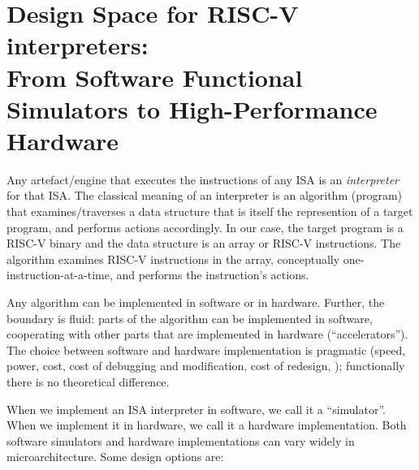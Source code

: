 

\chapter{Design Space for RISC-V interpreters: \\
{From Software Functional Simulators to High-Performance Hardware}}

\setcounter{page}{1}
\renewcommand{\thepage}{\arabic{chapter}-\arabic{page}}

\label{ch_RISCV_Design_Space}


Any artefact/engine that executes the instructions of any ISA is an
\emph{interpreter} for that ISA. The classical meaning of an
interpreter is an algorithm (program) that examines/traverses a data
structure that is itself the represention of a target program, and
performs actions accordingly.  In our case, the target program is a
RISC-V binary and the data structure is an array or RISC-V
instructions.  The algorithm examines RISC-V instructions in the
array, conceptually one-instruction-at-a-time, and performs the
instruction's actions.

Any algorithm can be implemented in software or in hardware.  Further,
the boundary is fluid: parts of the algorithm can be implemented in
software, cooperating with other parts that are implemented in
hardware (``accelerators'').  The choice between software and hardware
implementation is pragmatic (speed, power, cost, cost of debugging and
modification, cost of redesign, {\etc}); functionally there is no
theoretical difference.

When we implement an ISA interpreter in software, we call it a
``simulator''.  When we implement it in hardware, we call it a
hardware implementation.  Both software simulators and hardware
implementations can vary widely in microarchitecture.  Some design
options are:


